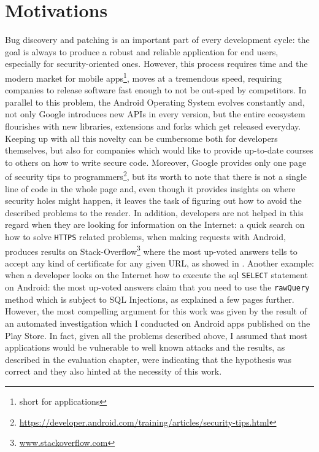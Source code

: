 \section{Motivations}
Bug discovery and patching is an important part of every development cycle: the goal is always to produce a robust and reliable application for end users, especially for security-oriented ones. However, this process requires time and the modern market for mobile apps\footnote{short for applications}, moves at a tremendous speed, requiring companies to release software fast enough to not be out-sped by competitors. In parallel to this problem, the Android Operating System evolves constantly and, not only Google introduces new APIs in every version, but the entire ecosystem flourishes with new libraries, extensions and forks which get released everyday.
Keeping up with all this novelty can be cumbersome both for developers themselves, but also for companies which would like to provide up-to-date courses to others on how to write secure code. Moreover, Google provides only one page of security tips to programmers\footnote{\url{https://developer.android.com/training/articles/security-tips.html}}, but its worth to note that there is not a single line of code in the whole page and, even though it provides insights on where security holes might happen,  it leaves the task of figuring out how to avoid the described problems to the reader. In addition, developers are not helped in this regard when they are looking for information on the Internet: a quick search on how to solve \texttt{HTTPS} related problems, when making requests with Android, produces results on Stack-Overflow\footnote{\url{www.stackoverflow.com}} where the most up-voted answers tells to accept any kind of certificate for any given URL, as showed in \cite{svm-hunter}. Another example: when a developer looks on the Internet how to execute the sql \texttt{SELECT} statement on Android: the most up-voted answers claim that you need to use the \texttt{rawQuery} method which is subject to SQL Injections, as explained a few pages further. However, the most compelling argument for this work was given by the result of an automated investigation which I conducted on Android apps published on the Play Store. In fact, given all the problems described above, I assumed that most applications would be vulnerable to well known attacks and the results, as described in the evaluation chapter, were indicating that the hypothesis was correct and they also hinted at the necessity of this work. 

